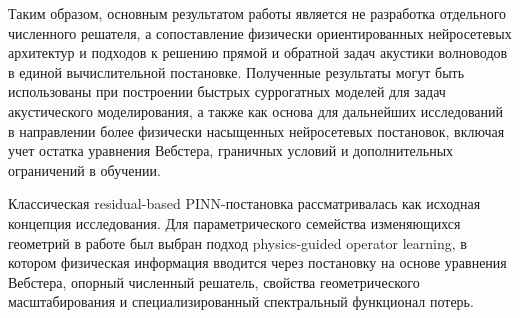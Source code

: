 Таким образом, основным результатом работы является не разработка отдельного численного решателя, а сопоставление физически ориентированных нейросетевых архитектур и подходов к решению прямой и обратной задач акустики волноводов в единой вычислительной постановке. Полученные результаты могут быть использованы при построении быстрых суррогатных моделей для задач акустического моделирования, а также как основа для дальнейших исследований в направлении более физически насыщенных нейросетевых постановок, включая учет остатка уравнения Вебстера, граничных условий и дополнительных ограничений в обучении.

Классическая residual-based PINN-постановка рассматривалась как исходная концепция исследования. Для параметрического семейства изменяющихся геометрий в работе был выбран подход physics-guided operator learning, в котором физическая информация вводится через постановку на основе уравнения Вебстера, опорный численный решатель, свойства геометрического масштабирования и специализированный спектральный функционал потерь.
